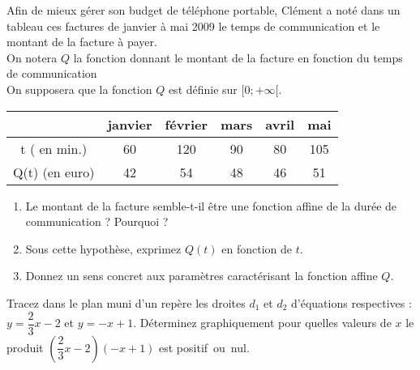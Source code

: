 %
%
%
\begin{exr}
Afin de mieux gérer son budget de téléphone portable, Clément a noté dans un tableau ces factures de janvier à  mai 2009 le temps de communication et le montant de la facture à  payer. \\ 
On notera $Q$ la fonction donnant le montant de la facture en fonction du temps de communication \\
On supposera que  la fonction $Q$ est définie sur $[0;+\infty[$. \\
  \begin{tabular}{|c|c|c|c|c|c|}\hline 
                           & janvier & février & mars &  avril  &  mai \\ \hline
  t ( en min.)       &   60  &  120 &    90  &    80 &    105 \\ \hline
  Q(t) (en euro)   &    42   &   54    &  48   &   46   &   51 \\ \hline
  \end{tabular}
  
  \vspace*{1ex}
  
  \begin{enumerate}
  \item Le montant de la facture semble-t-il être une fonction affine de la durée de communication ? Pourquoi ?
  \item Sous cette hypothèse, exprimez $Q(t)$ en fonction de $t$.
  \item Donnez un sens concret aux paramètres caractérisant la fonction affine $Q$.
  \end{enumerate}
\end{exr}
%
%
%
\begin{exr}
Tracez dans le plan muni d'un repère les droites $d_1$ et $d_2$ d'équations respectives : $y =\dfrac{2}{3}x-2$ et $y = -x+1$. 
Déterminez graphiquement pour quelles valeurs de $x$ le produit $\left(\dfrac{2}{3}x-2\right)(-x+1)$
 est positif~ou~nul.
\end{exr}
%
%
%
